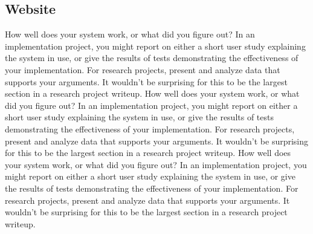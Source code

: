 \documentclass{acm_proc_article-sp}
\begin{document}
\subsection{Website}
How well does your system work, or what did you figure out? In an implementation project, you might report on either a short user study explaining the system in use, or give the results of tests demonstrating the effectiveness of your implementation. For research projects, present and analyze data that supports your arguments. It wouldn't be surprising for this to be the largest section in a research project writeup. How well does your system work, or what did you figure out? In an implementation project, you might report on either a short user study explaining the system in use, or give the results of tests demonstrating the effectiveness of your implementation. For research projects, present and analyze data that supports your arguments. It wouldn't be surprising for this to be the largest section in a research project writeup. How well does your system work, or what did you figure out? In an implementation project, you might report on either a short user study explaining the system in use, or give the results of tests demonstrating the effectiveness of your implementation. For research projects, present and analyze data that supports your arguments. It wouldn't be surprising for this to be the largest section in a research project writeup.
\end{document}
